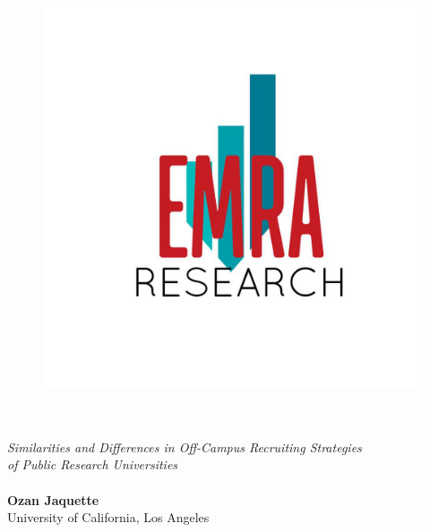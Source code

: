 \documentclass[twoside]{article}
\begin{document}

\begin{titlepage}

    \begin{figure}
        \includegraphics[width=.25\textwidth, right]{images/emra.jpg}
        \vspace{-1.1cm}
    \end{figure}

    \begin{mdframed}[backgroundcolor=LightBlue, linecolor=LightBlue, innerbottommargin=1.2cm]

        \centering\color{white}\fontsize{30}{60}

        \vspace{3cm}
         \\

        \vspace{0.8cm}
        \textbf{\color{LightPink}{OH, THE PLACES THEY'LL GO}} \\

        \vspace{0.6cm}
        \large\textit{Similarities and Differences in Off-Campus Recruiting Strategies \\ of Public Research Universities} \\

        \vspace{0.4cm}
         \\

        \vspace{10cm}
        \textbf{Ozan Jaquette} \\
        University of California, Los Angeles \\~\\
        \textit{\color{Gray}{Oct 2018}}

    \end{mdframed}
\end{titlepage}

 
\end{document}
